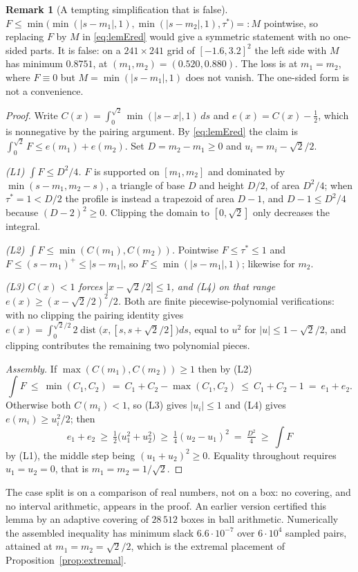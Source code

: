 \documentclass[11pt]{article}
\theoremstyle{definition}
\newtheorem{remark}[theorem]{Remark}
\begin{document}
\begin{remark}[A tempting simplification that is false]\label{rem:lemEfalse}
$F\le\min\bigl(\min(|s-m_1|,1),\min(|s-m_2|,1),\tau^\ast\bigr)=:M$ pointwise, so replacing
$F$ by $M$ in \eqref{eq:lemEred} would give a symmetric statement with no one-sided parts.
It is false: on a $241\times241$ grid of $[-1.6,3.2]^2$ the left side with $M$ has minimum
$0.8751$, at $(m_1,m_2)=(0.520,0.880)$. The loss is at $m_1=m_2$, where $F\equiv0$ but
$M=\min(|s-m_1|,1)$ does not vanish. The one-sided form is not a convenience.
\end{remark}

\begin{proof}
Write $C(x)=\int_0^{\sqrt2}\min(|s-x|,1)\,ds$ and $e(x)=C(x)-\tfrac12$, which is
nonnegative by the pairing argument. By \eqref{eq:lemEred} the claim is
$\int_0^{\sqrt2}F\le e(m_1)+e(m_2)$. Set $D=m_2-m_1\ge0$ and $u_i=m_i-\sqrt2/2$.

\emph{(L1) $\int F\le D^2/4$.} $F$ is supported on $[m_1,m_2]$ and dominated by
$\min(s-m_1,m_2-s)$, a triangle of base $D$ and height $D/2$, of area $D^2/4$; when
$\tau^\ast=1<D/2$ the profile is instead a trapezoid of area $D-1$, and $D-1\le D^2/4$
because $(D-2)^2\ge0$. Clipping the domain to $[0,\sqrt2]$ only decreases the integral.

\emph{(L2) $\int F\le\min(C(m_1),C(m_2))$.} Pointwise $F\le\tau^\ast\le1$ and
$F\le(s-m_1)^+\le|s-m_1|$, so $F\le\min(|s-m_1|,1)$; likewise for $m_2$.

\emph{(L3) $C(x)<1$ forces $|x-\sqrt2/2|\le1$, and (L4) on that range
$e(x)\ge(x-\sqrt2/2)^2/2$.} Both are finite piecewise-polynomial verifications: with no
clipping the pairing identity gives $e(x)=\int_0^{\sqrt2/2}2\operatorname{dist}
\bigl(x,[s,s+\sqrt2/2]\bigr)ds$, equal to $u^2$ for $|u|\le1-\sqrt2/2$, and clipping
contributes the remaining two polynomial pieces.

\emph{Assembly.} If $\max(C(m_1),C(m_2))\ge1$ then by (L2)
\[
  \int F\ \le\ \min(C_1,C_2)\ =\ C_1+C_2-\max(C_1,C_2)\ \le\ C_1+C_2-1\ =\ e_1+e_2 .
\]
Otherwise both $C(m_i)<1$, so (L3) gives $|u_i|\le1$ and (L4) gives
$e(m_i)\ge u_i^2/2$; then
\[
  e_1+e_2\ \ge\ \tfrac12\bigl(u_1^2+u_2^2\bigr)\ \ge\ \tfrac14(u_2-u_1)^2\ =\ \tfrac{D^2}4
  \ \ge\ \int F
\]
by (L1), the middle step being $(u_1+u_2)^2\ge0$. Equality throughout requires
$u_1=u_2=0$, that is $m_1=m_2=1/\sqrt2$.
\end{proof}

The case split is on a comparison of real numbers, not on a box: no covering, and no
interval arithmetic, appears in the proof. An earlier version certified this lemma by an
adaptive covering of $28\,512$ boxes in ball arithmetic. Numerically the assembled
inequality has minimum slack $6.6\cdot10^{-7}$ over $6\cdot10^4$ sampled pairs, attained
at $m_1=m_2=\sqrt2/2$, which is the extremal placement of
Proposition~\ref{prop:extremal}.
\end{document}
